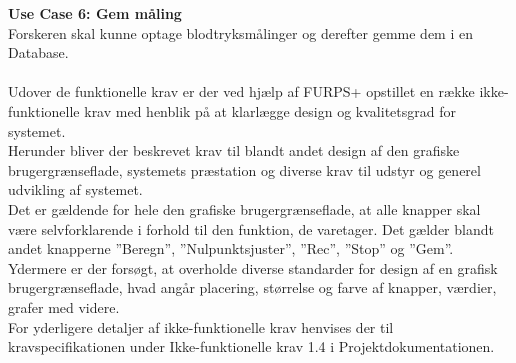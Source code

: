 \textbf{Use Case 6: Gem måling}\\
Forskeren skal kunne optage blodtryksmålinger og derefter gemme dem i en Database. 
\\\\
Udover de funktionelle krav er der ved hjælp af FURPS+ opstillet en række ikke-funktionelle krav med henblik på at klarlægge design og kvalitetsgrad for systemet. \\
Herunder bliver der beskrevet krav til blandt andet design af den grafiske brugergrænseflade, systemets præstation og diverse krav til udstyr og generel udvikling af systemet.\\
Det er gældende for hele den grafiske brugergrænseflade, at alle knapper skal være selvforklarende i forhold til den funktion, de varetager. Det gælder blandt andet knapperne ”Beregn”, ”Nulpunktsjuster”, ”Rec”, ”Stop” og ”Gem”.\\
Ydermere er der forsøgt, at overholde diverse standarder for design af en grafisk brugergrænseflade, hvad angår placering, størrelse og farve af knapper, værdier, grafer med videre.\\
For yderligere detaljer af ikke-funktionelle krav henvises der til kravspecifikationen under Ikke-funktionelle krav 1.4 i Projektdokumentationen.



 



